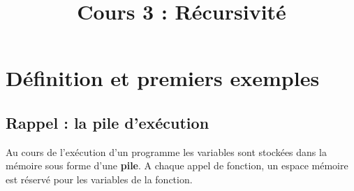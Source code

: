 \documentclass{../cours}
\title{Cours 3 : Récursivité}
\begin{document}
\maketitle
 
\section{Définition et premiers exemples}

\subsection{Rappel : la pile d'exécution}

Au cours de l'exécution d'un programme les variables sont stockées dans la mémoire sous forme d'une \textbf{pile}. A chaque appel de fonction, un espace mémoire est réservé pour les variables de la fonction.
\end{document}
